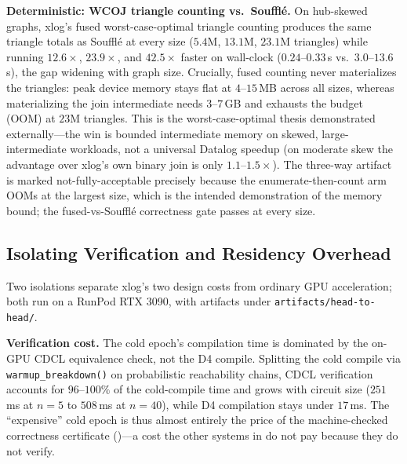 \textbf{Deterministic: WCOJ triangle counting vs.\ Soufflé.} On hub-skewed graphs, xlog's fused worst-case-optimal triangle counting produces the same triangle totals as Soufflé at every size ($5.4$M, $13.1$M, $23.1$M triangles) while running $12.6\times$, $23.9\times$, and $42.5\times$ faster on wall-clock ($0.24$--$0.33$\,s vs.\ $3.0$--$13.6$\,s), the gap widening with graph size. Crucially, fused counting never materializes the triangles: peak device memory stays flat at $4$--$15$\,MB across all sizes, whereas materializing the join intermediate needs $3$--$7$\,GB and exhausts the budget (OOM) at $23$M triangles. This is the worst-case-optimal thesis demonstrated externally---the win is bounded intermediate memory on skewed, large-intermediate workloads, not a universal Datalog speedup (on moderate skew the advantage over xlog's own binary join is only $1.1$--$1.5\times$). The three-way artifact is marked not-fully-acceptable precisely because the enumerate-then-count arm OOMs at the largest size, which is the intended demonstration of the memory bound; the fused-vs-Soufflé correctness gate passes at every size.

\subsection{Isolating Verification and Residency Overhead}\label{sec:overhead}

Two isolations separate xlog's two design costs from ordinary GPU acceleration; both run on a RunPod RTX 3090, with artifacts under \texttt{artifacts/head-to-head/}.

\textbf{Verification cost.} The cold epoch's compilation time is dominated by the on-GPU CDCL equivalence check, not the D4 compile. Splitting the cold compile via \texttt{warmup\_breakdown()} on probabilistic reachability chains, CDCL verification accounts for $96$--$100\%$ of the cold-compile time and grows with circuit size ($251$\,ms at $n{=}5$ to $508$\,ms at $n{=}40$), while D4 compilation stays under $17$\,ms. The ``expensive'' cold epoch is thus almost entirely the price of the machine-checked correctness certificate ()---a cost the other systems in  do not pay because they do not verify.

